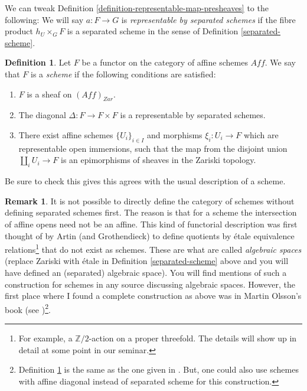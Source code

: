 \documentclass[11pt]{amsart}
\newcommand{\Z}{{\mathbb Z}}
\theoremstyle{definition}
\newtheorem{definition}[theorem]{Definition}
\newtheorem{remark}[theorem]{Remark}
\begin{document}
We can tweak Definition \ref{definition-representable-map-presheaves} to the following: We will say $a: F\rightarrow G$ is \textit{representable by separated schemes} if the fibre product $h_U\times_G F$ is a separated scheme in the sense of Definition \ref{separated-scheme}.

\begin{definition}\label{scheme}
		Let $F$ be a functor on the category of affine schemes $\mathit{Aff}$. We say that $F$ is a \textit{scheme} if the following conditions are satisfied:
	\begin{enumerate}
		\item $F$ is a sheaf on $(\mathit{Aff})_{\textit{Zar}}$.
		\item The diagonal $\Delta: F\rightarrow F\times F$ is a representable by separated schemes.
		\item There exist affine schemes $\{U_i\}_{i\in I}$ and morphisms $\xi_i: U_i\rightarrow F$ which are representable open immersions, such that the map from the disjoint union $\amalg_i U_i\rightarrow F$ is an epimorphisms of sheaves in the Zariski topology.
	\end{enumerate}
\end{definition}

Be sure to check this gives this agrees with the usual description of a scheme.

\begin{remark}
	It is not possible to directly define the category of schemes without defining separated schemes first. The reason is that for a scheme the intersection of affine opens need not be an affine. This kind of functorial description was first thought of by Artin (and Grothendieck) to define quotients by \'{e}tale equivalence relations\footnote{For example, a $\Z/2$-action on a proper threefold. The details will show up in detail at some point in our seminar.} that do not exist as schemes. These are what are called \textit{algebraic spaces} (replace Zariski with \'{e}tale in Definition \ref{separated-scheme} above and you will have defined an (separated) algebraic space). You will find mentions of such a construction for schemes in any source discussing algebraic spaces. However, the first place where I found a complete construction as above was in Martin Olsson's book (see \cite{olsson16})\footnote{Definition \ref{scheme} is the same as the one given in \cite{olsson16}. But, one could also use schemes with affine diagonal instead of separated scheme for this construction.}.
\end{remark}

\newpage


\end{document}
